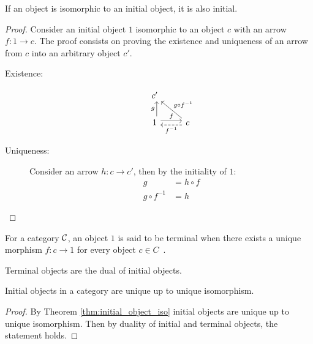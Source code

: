 \begin{theorem}
  If an object is isomorphic to an initial object, it is also initial.

  \begin{proof}
    Consider an initial object $1$ isomorphic to an object $c$ with an arrow
    $f:1\to c$. The proof consists on proving the existence and uniqueness of an
    arrow from $c$ into an arbitrary object $c'$.

    \begin{description}
      \item[Existence:]
        \[\begin{tikzcd}[ampersand replacement=\&]
          {c'} \\
          1 \& c
          \arrow["f", shift left=1, from=2-1, to=2-2]
          \arrow["{f^{-1}}", shift left=1, dashed, from=2-2, to=2-1]
          \arrow["g", shift right=1, from=2-1, to=1-1]
          \arrow["{g\circ f^{-1}}"', from=2-2, to=1-1]
        \end{tikzcd}\]
      \item[Uniqueness:] Consider an arrow $h:c\to c'$, then by the initiality
        of $1$:
        \[
          \begin{aligned}
            g &= h\circ f\\
            g\circ f^{-1} &= h
          \end{aligned}
        \]
    \end{description}
  \end{proof}
\end{theorem}

\begin{definition}
  For a category $\mathcal{C}$, an object $1$ is said to be terminal when there exists a
  unique morphism $f: c\to 1$ for every object $c\in
  C$~\parencite{awodey:category_theory}.
\end{definition}

\begin{remark}
  Terminal objects are the dual of initial objects.
\end{remark}

\begin{theorem}
  Initial objects in a category are unique up to unique isomorphism.

  \begin{proof}
    By Theorem \ref{thm:initial_object_iso} initial objects are unique up to
    unique isomorphism. Then by duality of initial and terminal objects, the
    statement holds.
  \end{proof}
\end{theorem}

